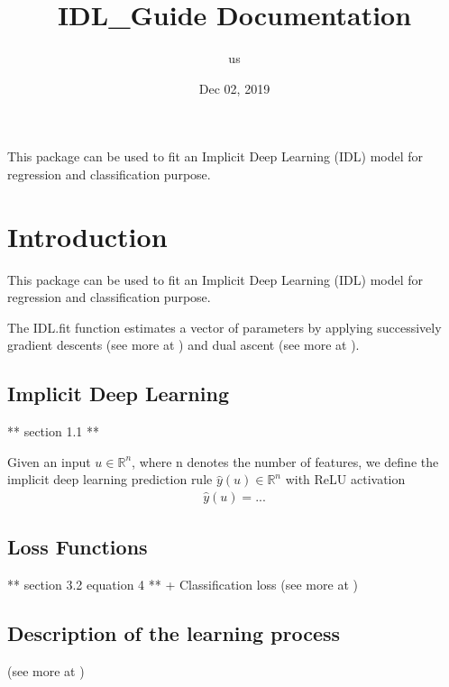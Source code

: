 \documentclass[letterpaper,10pt,english]{sphinxmanual}
\title{IDL\_Guide Documentation}
\date{Dec 02, 2019}
\author{us}
\begin{document}
\pagestyle{empty}
\sphinxmaketitle
\pagestyle{plain}
\sphinxtableofcontents
\pagestyle{normal}
\label{\detokenize{index::doc}}


This package can be used to fit an Implicit Deep Learning (IDL)
model for regression and classification purpose.


\chapter{Introduction}
\label{\detokenize{sections/introduction:introduction}}\label{\detokenize{sections/introduction::doc}}
This package can be used to fit an Implicit Deep Learning (IDL) model for regression
and classification purpose.

The IDL.fit function estimates a vector of parameters by applying successively
gradient descents (see more at {\hyperref[\detokenize{sections/gradient_descents:gradient-descents}]{}}) and dual ascent
(see more at {\hyperref[\detokenize{sections/dual_ascents:dual-ascents}]{}}).


\section{Implicit Deep Learning}
\label{\detokenize{sections/introduction:id1}}
** section 1.1 **

Given an input \(u \in \mathbb{R}^n\), where n denotes the number of features,
we define the implicit deep learning prediction rule \(\hat{y}(u) \in \mathbb{R}^n\) with ReLU activation
\begin{equation*}
\begin{split}\hat{y}(u) = ...\end{split}
\end{equation*}

\section{Loss Functions}
\label{\detokenize{sections/introduction:loss-functions}}
** section 3.2 equation 4 ** + Classification loss
(see more at {\hyperref[\detokenize{sections/learning:learning}]{}})


\section{Description of the learning process}
\label{\detokenize{sections/introduction:description-of-the-learning-process}}
(see more at {\hyperref[\detokenize{sections/bi_convex_formulation:formulation}]{}})
\end{document}
